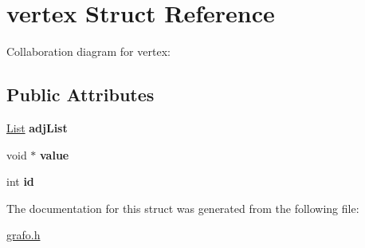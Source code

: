\hypertarget{structvertex}{}\section{vertex Struct Reference}
\label{structvertex}


Collaboration diagram for vertex\+:
\subsection*{Public Attributes}
\begin{DoxyCompactItemize}
\item 
\mbox{\label{structvertex_a30d637066c3489c97598af69394d187e}} 
\hyperlink{lista_8h_a698ff83165b8296011a50bb9aba83964}{List} {\bfseries adj\+List}
\item 
\mbox{\label{structvertex_aa610e7fdb75c270e113b935187b31276}} 
void $\ast$ {\bfseries value}
\item 
\mbox{\label{structvertex_a174bbdee712ca98fb591504ce66ed006}} 
int {\bfseries id}
\end{DoxyCompactItemize}


The documentation for this struct was generated from the following file\+:\begin{DoxyCompactItemize}
\item 
\hyperlink{grafo_8h}{grafo.\+h}\end{DoxyCompactItemize}
